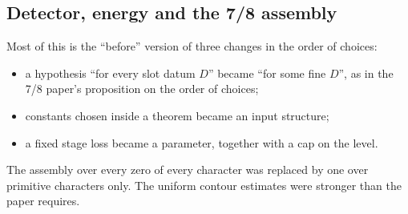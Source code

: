 \documentclass[11pt,a4paper]{article}
\begin{document}
\subsection{Detector, energy and the 7/8 assembly}
Most of this is the ``before'' version of three changes in the order of choices:
\begin{itemize}
\item a hypothesis ``for every slot datum $D$'' became ``for some fine $D$'', as in the 7/8 paper's
proposition on the order of choices;
\item constants chosen inside a theorem became an input structure;
\item a fixed stage loss became a parameter, together with a cap on the level.
\end{itemize}
The assembly over every zero of every character was replaced by one over primitive characters only.
The uniform contour estimates were stronger than the paper requires.
\end{document}
